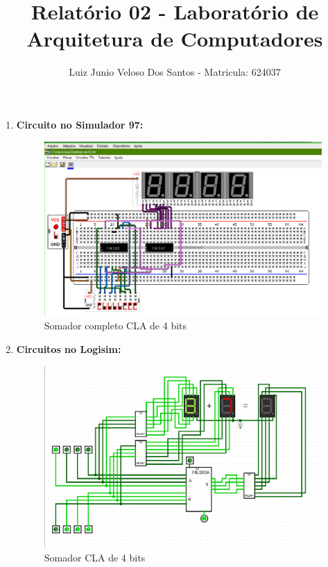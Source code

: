 \documentclass[a4paper,11pt]{article}
\title{\vspace{-4cm}Relatório 02 - Laboratório de Arquitetura de Computadores}
\author{Luiz Junio Veloso Dos Santos - Matricula: 624037}
\begin{document}
 

\maketitle

\begin{enumerate} 
    \item \textbf{Circuito no Simulador 97:}
        \begin{figure}[ht]
            \caption{Somador completo CLA de 4 bits }
            \centering
            \includegraphics[width=17cm]{somadorCompleto97.png}
        \end{figure}
        \newpage
    \item \textbf{Circuitos no Logisim:}
        \begin{figure}[ht]
            \caption{Somador CLA de 4 bits}
            \centering
            \includegraphics[width=17cm]{somadorCLA-logisim}
        \end{figure}

\end{enumerate}
\end{document}
